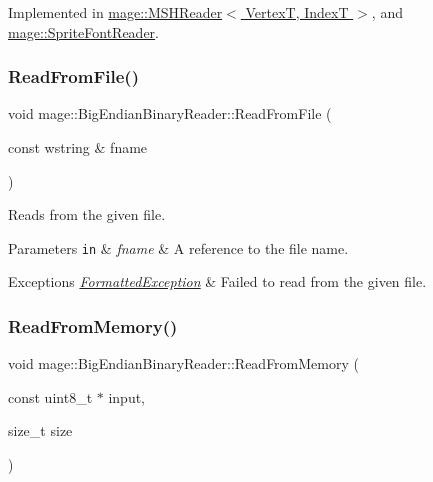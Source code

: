 Implemented in \hyperlink{classmage_1_1_m_s_h_reader_a26b60060bf61183fb5758a4725c6a205}{mage\+::\+M\+S\+H\+Reader$<$ Vertex\+T, Index\+T $>$}, and \hyperlink{classmage_1_1_sprite_font_reader_af380ae127285a88ae41e35a9067db412}{mage\+::\+Sprite\+Font\+Reader}.

\hypertarget{classmage_1_1_big_endian_binary_reader_aec453e82d9b318e04894d4168db23715}{}\label{classmage_1_1_big_endian_binary_reader_aec453e82d9b318e04894d4168db23715} 
\subsubsection{\texorpdfstring{Read\+From\+File()}{ReadFromFile()}}
{\footnotesize\ttfamily void mage\+::\+Big\+Endian\+Binary\+Reader\+::\+Read\+From\+File (\begin{DoxyParamCaption}\item[{const wstring \&}]{fname }\end{DoxyParamCaption})}

Reads from the given file.


\begin{DoxyParams}[1]{Parameters}
\mbox{\tt in}  & {\em fname} & A reference to the file name. \\
\hline
\end{DoxyParams}

\begin{DoxyExceptions}{Exceptions}
{\em \hyperlink{structmage_1_1_formatted_exception}{Formatted\+Exception}} & Failed to read from the given file. \\
\hline
\end{DoxyExceptions}
\hypertarget{classmage_1_1_big_endian_binary_reader_ac90695d1cc20a897a0f37c7442703e7e}{}\label{classmage_1_1_big_endian_binary_reader_ac90695d1cc20a897a0f37c7442703e7e} 
\subsubsection{\texorpdfstring{Read\+From\+Memory()}{ReadFromMemory()}}
{\footnotesize\ttfamily void mage\+::\+Big\+Endian\+Binary\+Reader\+::\+Read\+From\+Memory (\begin{DoxyParamCaption}\item[{const uint8\+\_\+t $\ast$}]{input,  }\item[{size\+\_\+t}]{size }\end{DoxyParamCaption})}

